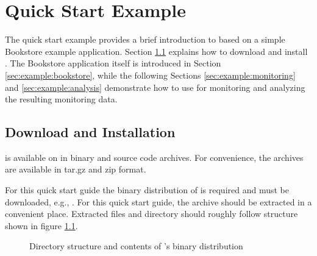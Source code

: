 % 


\chapter{Quick Start Example}\label{chap:example}

The quick start example provides a brief introduction to \Kieker{} based on a simple Bookstore example application. 
Section \ref{sec:example:downloadInstall} explains how to download and install \Kieker{}. The Bookstore application itself is introduced in Section \ref{sec:example:bookstore}, while the following Sections \ref{sec:example:monitoring} and \ref{sec:example:analysis} demonstrate how to use \Kieker{} for monitoring and analyzing the resulting monitoring data.

\section{Download and Installation}\label{sec:example:downloadInstall}

\Kieker{} is available on \KiekerURL{} in binary and source code archives. For convenience, the archives are available in tar.gz and zip format.

For this quick start guide the binary distribution of \Kieker{} is required and must be downloaded, e.g., \file{\binaryFileForDownload}. For this quick start guide, the archive should be extracted in a convenient place. Extracted files and directory should roughly follow structure shown in figure \ref{fig:binary-layout}.

\begin{figure}[H]
\begin{graybox}
\end{graybox}
\caption{Directory structure and contents of \Kieker{}'s binary distribution}
\label{fig:binary-layout}
\end{figure}

